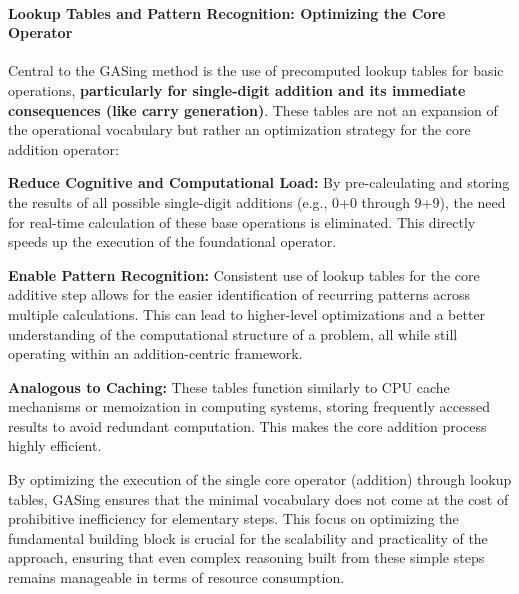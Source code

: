 \paragraph{Lookup Tables and Pattern Recognition: Optimizing the Core Operator}

Central to the GASing method is the use of precomputed lookup tables for basic operations, \textbf{particularly for single-digit addition and its immediate consequences (like carry generation)}. These tables are not an expansion of the operational vocabulary but rather an optimization strategy for the core addition operator:


\noindent\textbf{\textbf{Reduce Cognitive and Computational Load}:} By pre-calculating and storing the results of all possible single-digit additions (e.g., 0+0 through 9+9), the need for real-time calculation of these base operations is eliminated. This directly speeds up the execution of the foundational operator.


\noindent\textbf{\textbf{Enable Pattern Recognition}:} Consistent use of lookup tables for the core additive step allows for the easier identification of recurring patterns across multiple calculations. This can lead to higher-level optimizations and a better understanding of the computational structure of a problem, all while still operating within an addition-centric framework.


\noindent\textbf{\textbf{Analogous to Caching}:} These tables function similarly to CPU cache mechanisms or memoization in computing systems, storing frequently accessed results to avoid redundant computation. This makes the core addition process highly efficient.


By optimizing the execution of the single core operator (addition) through lookup tables, GASing ensures that the minimal vocabulary does not come at the cost of prohibitive inefficiency for elementary steps. This focus on optimizing the fundamental building block is crucial for the scalability and practicality of the approach, ensuring that even complex reasoning built from these simple steps remains manageable in terms of resource consumption.

